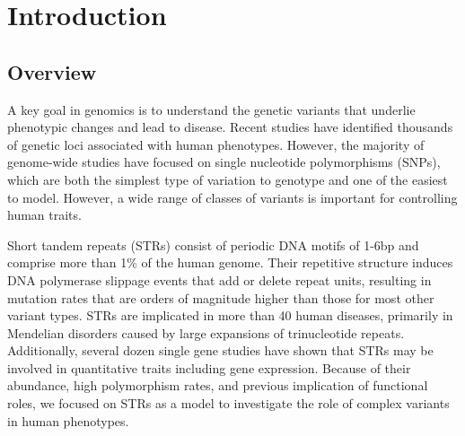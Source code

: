 \iffalse  \fi

\chapter{Introduction}

\section{Overview}

A key goal in genomics is to understand the genetic variants that underlie phenotypic changes and lead to disease. Recent studies have identified thousands of genetic loci associated with human phenotypes. However, the majority of genome-wide studies have focused on single nucleotide polymorphisms (SNPs), which are both the simplest type of variation to genotype and one of the easiest to model. However, a wide range of  classes of variants is important for controlling human traits.

Short tandem repeats (STRs) consist of periodic DNA motifs of 1-6bp and comprise more than 1\% of the human genome. Their repetitive structure induces DNA polymerase slippage events that add or delete repeat units, resulting in mutation rates that are orders of magnitude higher than those for most other variant types. STRs are implicated in more than 40 human diseases, primarily in Mendelian disorders caused by large expansions of trinucleotide repeats. Additionally, several dozen single gene studies have shown that STRs may be involved in quantitative traits including gene expression. Because of their abundance, high polymorphism rates, and previous implication of functional roles, we focused on STRs as a model to investigate the role of complex variants in human phenotypes.


